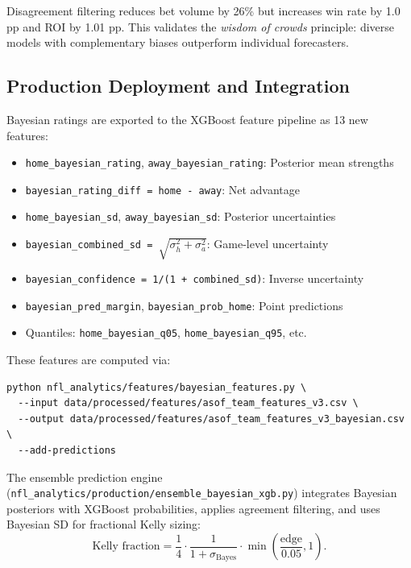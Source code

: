 Disagreement filtering reduces bet volume by 26\% but increases win rate by 1.0 pp and ROI by 1.01 pp. This validates the \emph{wisdom of crowds} principle: diverse models with complementary biases outperform individual forecasters.



\subsection{Production Deployment and Integration}

Bayesian ratings are exported to the XGBoost feature pipeline as 13 new features:
\begin{itemize}
  \item \texttt{home\_bayesian\_rating}, \texttt{away\_bayesian\_rating}: Posterior mean strengths
  \item \texttt{bayesian\_rating\_diff = home - away}: Net advantage
  \item \texttt{home\_bayesian\_sd}, \texttt{away\_bayesian\_sd}: Posterior uncertainties
  \item \texttt{bayesian\_combined\_sd = $\sqrt{\sigma_h^2 + \sigma_a^2}$}: Game-level uncertainty
  \item \texttt{bayesian\_confidence = 1/(1 + combined\_sd)}: Inverse uncertainty
  \item \texttt{bayesian\_pred\_margin}, \texttt{bayesian\_prob\_home}: Point predictions
  \item Quantiles: \texttt{home\_bayesian\_q05}, \texttt{home\_bayesian\_q95}, etc.
\end{itemize}

These features are computed via:
\begin{verbatim}
python nfl_analytics/features/bayesian_features.py \
  --input data/processed/features/asof_team_features_v3.csv \
  --output data/processed/features/asof_team_features_v3_bayesian.csv \
  --add-predictions
\end{verbatim}

The ensemble prediction engine (\texttt{nfl\_analytics/production/ensemble\_bayesian\_xgb.py}) integrates Bayesian posteriors with XGBoost probabilities, applies agreement filtering, and uses Bayesian SD for fractional Kelly sizing:
\begin{equation}
\text{Kelly fraction} = \frac{1}{4} \cdot \frac{1}{1 + \sigma_{\text{Bayes}}} \cdot \min\left(\frac{\text{edge}}{0.05}, 1\right).
\end{equation}

